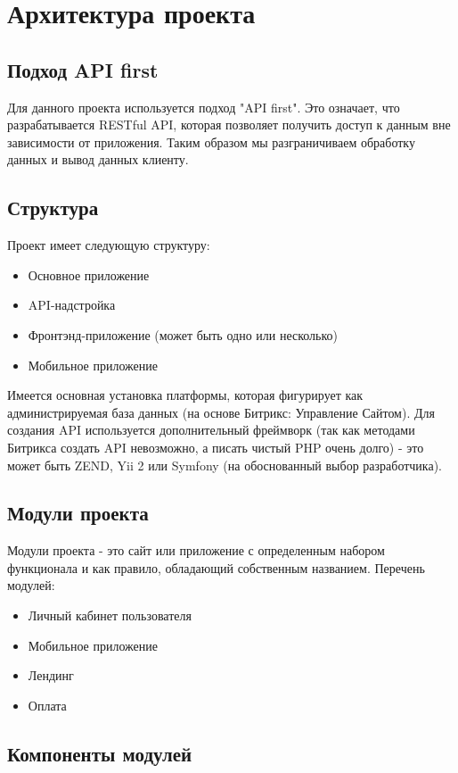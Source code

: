 \documentclass[DIV=calc, paper=a4, fontsize=11pt]{scrartcl} %
\begin{document}
\section{Архитектура проекта}

\subsection{Подход API first}
Для данного проекта используется подход "API first". Это означает, что разрабатывается RESTful API, которая позволяет получить доступ к данным вне зависимости от приложения. Таким образом мы разграничиваем обработку данных и вывод данных клиенту.

\subsection{Структура}
Проект имеет следующую структуру:
\begin{itemize}
	\item Основное приложение
	\item API-надстройка
	\item Фронтэнд-приложение (может быть одно или несколько)
	\item Мобильное приложение
\end{itemize}
Имеется основная установка платформы, которая фигурирует как администрируемая база данных (на основе Битрикс: Управление Сайтом). Для создания API используется дополнительный фреймворк (так как методами Битрикса создать API невозможно, а писать чистый PHP очень долго) - это может быть ZEND, Yii 2 или Symfony (на обоснованный выбор разработчика).

\subsection{Модули проекта}
Модули проекта - это сайт или приложение с определенным набором функционала и как правило, обладающий собственным названием. Перечень модулей:
\begin{itemize}
	\item Личный кабинет пользователя
	\item Мобильное приложение
	\item Лендинг
	\item Оплата
\end{itemize}


\subsection{Компоненты модулей}
\end{document}
